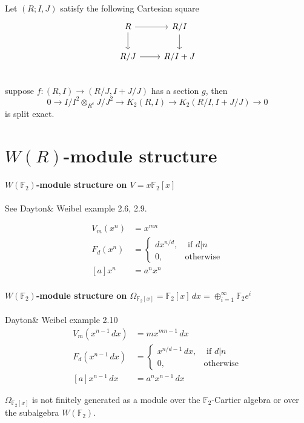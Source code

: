 \begin{lemma}
	Let $(R;I,J)$ satisfy the following Cartesian square
		\[\begin{tikzcd}
			R \ar[r] \ar[d]& R/I\ar[d]\\
			R/J \ar[r] & R/I+J\\
		\end{tikzcd}\]
	suppose $f\colon (R,I)\longrightarrow (R/J,I+J/J)$ has a section $g$, then
	\[0 \longrightarrow I/I^2\otimes_{R^e}J/J^2\longrightarrow K_2(R,I)\longrightarrow K_2(R/I,I+J/J)\longrightarrow 0\]
	is split exact.
\end{lemma}


\section{\texorpdfstring{$W(R)$}{W(R)}-module structure} %
\label{sec:module_structure}


\paragraph{$W(\mathbb{F}_2)$-module structure on $V=x \mathbb{F}_2[x]$} See Dayton\& Weibel \cite{MR96j:16008} example 2.6, 2.9.

\begin{align*}
 V_m(x^n)&=x^{mn}\\
 F_d(x^n)&=\begin{cases}
 	dx^{n/d},& \mbox{ if $d|n$}\\
 	0,& \mbox{otherwise}
 \end{cases}\\
 [a]x^n&=a^nx^n
 \end{align*}
\paragraph{$W(\mathbb{F}_2)$-module structure on $\Omega_{\mathbb{F}_2[x]}=\mathbb{F}_2[x]\,dx = \oplus_{i=1}^\infty \mathbb{F}_2 e^i$} Dayton\& Weibel \cite{MR96j:16008}example 2.10
\begin{align*}
 V_m(x^{n-1}\,dx)&=mx^{mn-1}\,dx\\
 F_d(x^{n-1}\,dx)&=\begin{cases}
 	x^{n/d-1}\,dx,& \mbox{ if $d|n$}\\
 	0,& \mbox{otherwise}
 \end{cases}\\
 [a]x^{n-1}\,dx&=a^nx^{n-1}\,dx
 \end{align*}
 \begin{remark}
 	$\Omega_{\mathbb{F}_2[x]}$ is {\color{red}not} finitely generated as a module over the $\mathbb{F}_2$-Cartier algebra or over the subalgebra $W(\mathbb{F}_2)$.
 \end{remark}

